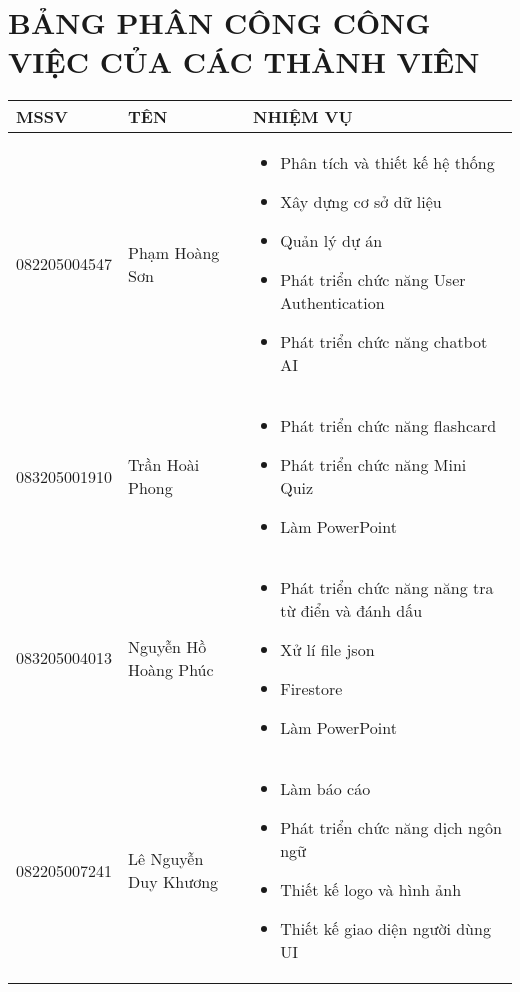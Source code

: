 \section*{\centering BẢNG PHÂN CÔNG CÔNG VIỆC CỦA CÁC THÀNH VIÊN}
\begin{center}
\renewcommand{\arraystretch}{1.5} %
\begin{tabular}{|p{3cm}|p{4cm}|p{8cm}|}
\hline
\rowcolor{} \textbf{MSSV} & \textbf{TÊN} & \textbf{NHIỆM VỤ} \\
\hline
082205004547 & Phạm Hoàng Sơn & 
    \begin{itemize}
        \item Phân tích và thiết kế hệ thống
        \item Xây dựng cơ sở dữ liệu
        \item Quản lý dự án
        \item Phát triển chức năng User Authentication
        \item Phát triển chức năng  chatbot AI 
    \end{itemize} \\
\hline
083205001910 & Trần Hoài Phong & 
    \begin{itemize}
        \item Phát triển chức năng flashcard
        \item Phát triển chức năng Mini Quiz
        \item Làm PowerPoint 
    \end{itemize} \\
\hline
083205004013 & Nguyễn Hồ Hoàng Phúc & 
    \begin{itemize}
        \item Phát triển chức năng năng tra từ điển và đánh dấu 
        \item Xử lí file json
        \item Firestore
        \item Làm PowerPoint 
    \end{itemize} \\
\hline
082205007241 & Lê Nguyễn Duy Khương & 
    \begin{itemize}
        \item Làm báo cáo
        \item Phát triển chức năng dịch ngôn ngữ
        \item Thiết kế logo và hình ảnh
        \item Thiết kế giao diện người dùng UI
    \end{itemize} \\
\hline
\end{tabular}
\end{center}
\newpage
